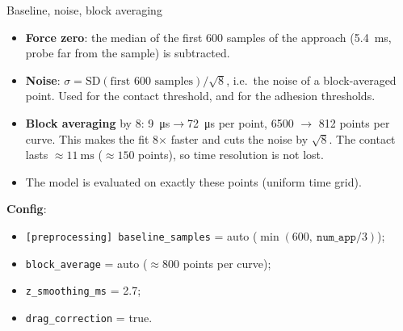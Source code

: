 \documentclass[aspectratio=169,9pt]{beamer}
\begin{document}
\begin{frame}{Baseline, noise, block averaging}
\small
\begin{itemize}
\item \textbf{Force zero}: the median of the first 600 samples of the approach (\SI{5.4}{\milli\second}, probe far from the sample) is subtracted.
\item \textbf{Noise}: $\sigma=\mathrm{SD}(\text{first 600 samples})/\sqrt{8}$, i.e.\ the noise of a block-averaged point. Used for the contact threshold, and for the adhesion thresholds.
\item \textbf{Block averaging} by 8: \SI{9}{\micro\second}$\to$\SI{72}{\micro\second} per point, 6500 $\to$ 812 points per curve. This makes the fit 8$\times$ faster and cuts the noise by $\sqrt8$. The contact lasts $\approx\SI{11}{\milli\second}$ ($\approx150$ points), so time resolution is not lost.
\item The model is evaluated on exactly these points (uniform time grid).
\end{itemize}
\textbf{Config}:
\begin{itemize}
\item \texttt{[preprocessing] baseline\_samples} = auto ($\min(600,\ \texttt{num\_app}/3)$);
\item \texttt{block\_average} = auto ($\approx800$ points per curve);
\item \texttt{z\_smoothing\_ms} = 2.7;
\item \texttt{drag\_correction} = true.
\end{itemize}
\end{frame}
\end{document}
